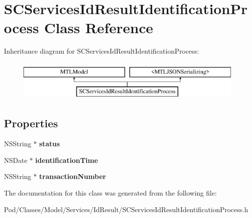 \hypertarget{interface_s_c_services_id_result_identification_process}{}\section{S\+C\+Services\+Id\+Result\+Identification\+Process Class Reference}
\label{interface_s_c_services_id_result_identification_process}
Inheritance diagram for S\+C\+Services\+Id\+Result\+Identification\+Process\+:\begin{figure}[H]
\begin{center}
\leavevmode
\includegraphics[height=2.000000cm]{interface_s_c_services_id_result_identification_process}
\end{center}
\end{figure}
\subsection*{Properties}
\begin{DoxyCompactItemize}
\item 
N\+S\+String $\ast$ {\bfseries status}\hypertarget{interface_s_c_services_id_result_identification_process_a802cd690ff277dab58671e1c101f76d3}{}\label{interface_s_c_services_id_result_identification_process_a802cd690ff277dab58671e1c101f76d3}

\item 
N\+S\+Date $\ast$ {\bfseries identification\+Time}\hypertarget{interface_s_c_services_id_result_identification_process_a6304deb086d94204350ca16fd01f8624}{}\label{interface_s_c_services_id_result_identification_process_a6304deb086d94204350ca16fd01f8624}

\item 
N\+S\+String $\ast$ {\bfseries transaction\+Number}\hypertarget{interface_s_c_services_id_result_identification_process_a7bb2716f1d8d2fdde5bcaf6577ff8f2a}{}\label{interface_s_c_services_id_result_identification_process_a7bb2716f1d8d2fdde5bcaf6577ff8f2a}

\end{DoxyCompactItemize}


The documentation for this class was generated from the following file\+:\begin{DoxyCompactItemize}
\item 
Pod/\+Classes/\+Model/\+Services/\+Id\+Result/S\+C\+Services\+Id\+Result\+Identification\+Process.\+h\end{DoxyCompactItemize}
